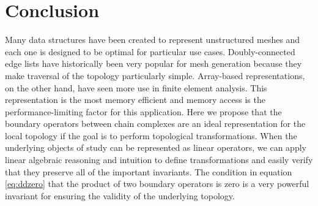 \documentclass[twocolumn]{article}
\begin{document}
\section{Conclusion}

Many data structures have been created to represent unstructured meshes and each one is designed to be optimal for particular use cases.
Doubly-connected edge lists have historically been very popular for mesh generation because they make traversal of the topology particularly simple.
Array-based representations, on the other hand, have seen more use in finite element analysis.
This representation is the most memory efficient and memory access is the performance-limiting factor for this application.
Here we propose that the boundary operators between chain complexes are an ideal representation for the local topology if the goal is to perform topological transformations.
When the underlying objects of study can be represented as linear operators, we can apply linear algebraic reasoning and intuition to define transformations and easily verify that they preserve all of the important invariants.
The condition in equation \eqref{eq:ddzero} that the product of two boundary operators is zero is a very powerful invariant for ensuring the validity of the underlying topology.



\end{document}

